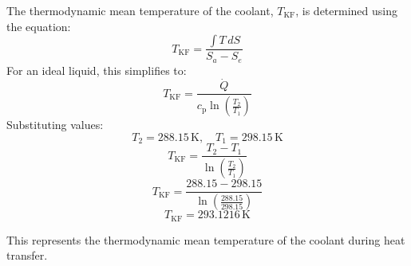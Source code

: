 The thermodynamic mean temperature of the coolant, \( T_{\text{KF}} \), is determined using the equation:  
\[
T_{\text{KF}} = \frac{\int T \, dS}{S_a - S_e}
\]  
For an ideal liquid, this simplifies to:  
\[
T_{\text{KF}} = \frac{\dot{Q}}{c_{\text{p}} \ln \left( \frac{T_2}{T_1} \right)}
\]  
Substituting values:  
\[
T_2 = 288.15 \, \text{K}, \quad T_1 = 298.15 \, \text{K}
\]  
\[
T_{\text{KF}} = \frac{T_2 - T_1}{\ln \left( \frac{T_2}{T_1} \right)}
\]  
\[
T_{\text{KF}} = \frac{288.15 - 298.15}{\ln \left( \frac{288.15}{298.15} \right)}
\]  
\[
T_{\text{KF}} = 293.1216 \, \text{K}
\]  

This represents the thermodynamic mean temperature of the coolant during heat transfer.